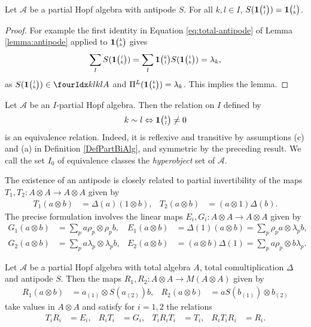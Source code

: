 \begin{Lem}\label{LemAntiUnit} Let $\mathscr{A}$ be a partial Hopf algebra with antipode $S$. For all $k,l\in I$, $S(\mathbf{1}{\tiny {\begin{pmatrix} k\\l\end{pmatrix}}}) = \mathbf{1}{\tiny {\begin{pmatrix} l\\k\end{pmatrix}}}$.
\end{Lem}
\begin{proof} For example the first identity in Equation \eqref{eq:total-antipode} of Lemma \ref{lemma:antipode} applied to $\mathbf{1}{\tiny {\begin{pmatrix} k\\k\end{pmatrix}}}$ gives \[\sum_l S(\mathbf{1}{\tiny {\begin{pmatrix} l\\k\end{pmatrix}}}) = \sum_l \mathbf{1}{\tiny {\begin{pmatrix} k\\l\end{pmatrix}}}S(\mathbf{1}{\tiny {\begin{pmatrix} l\\k\end{pmatrix}}}) = \lambda_k,\] as $S(\UnitC{l}{k}) \in \Gr{A}{k}{k}{l}{l}$ and $\Pi^{L}(\mathbf{1}{\tiny {\begin{pmatrix} k\\k\end{pmatrix}}}) = \lambda_k$. This implies the lemma.
\end{proof} 
\begin{Rem} \label{remark:index-equivalence}
  Let $\mathscr{A}$ be an $I$-partial Hopf algebra. Then the relation
  on $I$ defined by
  \begin{align*}
    k \sim l \Leftrightarrow \mathbf{1}{\tiny {\begin{pmatrix} k\\l\end{pmatrix}}} \neq 0
  \end{align*}
is an equivalence relation. Indeed, it is reflexive and transitive by
assumptions (c) and (a) in Definition \ref{DefPartBiAlg}, and
symmetric by the preceding result. We call the set $I_0$ of equivalence classes the \emph{hyperobject} set of $\mathscr{A}$. %
\end{Rem}
The existence of an antipode is closely related to partial invertibility of
the maps $T_{1},T_{2} \colon A \otimes A \to A\otimes A$ given by
\begin{align} \label{eq:wt-12}
  T_{1} (a\otimes b)&= \Delta(a)(1 \otimes b), &
  T_{2} (a\otimes b)&= (a \otimes 1)\Delta(b).
 \end{align}
The precise formulation involves the linear maps $E_{i},G_{i}
 \colon A\otimes A\to A\otimes A$ given by
\begin{align} \label{eq:e1g1}
  G_{1}(a\otimes b) &=
 \sum_{p} a\rho_{p} \otimes \rho_{p}b, &  E_{1}(a \otimes b) &=\Delta(1)(a\otimes b)=\sum_{p} \rho_{p}a\otimes \lambda_{p}b, \\ \label{eq:e2g2}
 G_{2}(a \otimes b) &= \sum_{p} a\lambda_{p} \otimes
    \lambda_{p}b, &
E_{2}(a\otimes b) &= (a\otimes b)\Delta(1)=\sum_{p} a\rho_{p} \otimes b\lambda_{p}.
\end{align}
\begin{Prop} \label{prop:riti}
  Let $\mathscr{A}$ be a partial Hopf algebra with total algebra $A$,
  total comultiplication $\Delta$ and antipode  $S$. Then the maps
  $R_{1},R_{2} \colon A \otimes A \to M(A \otimes A)$ given by
  \begin{align*}
    R_{1}(a \otimes b) &= a_{(1)}\otimes S(a_{(2)})b, &
    R_{2}(a\otimes b) &= aS(b_{(1)})\otimes b_{(2)}
  \end{align*}
  take values in $A\otimes A$ and satisfy for $i=1,2$ the relations
  \begin{align} \label{eq:riti}
    T_{i}R_{i}&=E_{i}, & R_{i}T_{i}&= G_{i}, & T_{i}R_{i}T_{i}&= T_{i}, & R_{i}T_{i}R_{i} &= R_{i}.
  \end{align}
\end{Prop}
